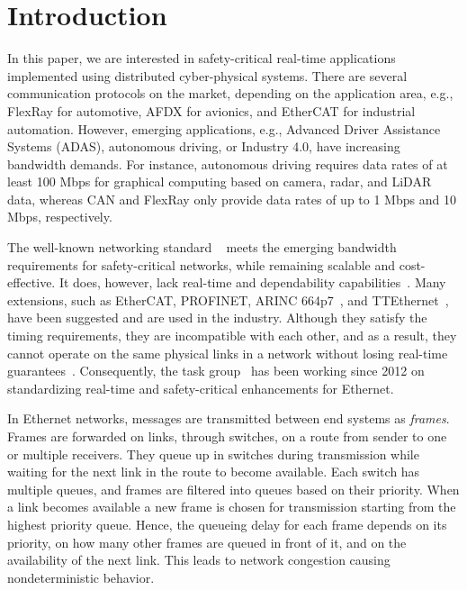 \vspace{-0.1cm}
\section{Introduction}
In this paper, we are interested in safety-critical real-time applications implemented using distributed cyber-physical systems. There are several communication protocols on the market, depending on the application area, e.g., FlexRay for automotive, AFDX for avionics, and EtherCAT for industrial automation.
However, emerging applications, e.g., Advanced Driver Assistance Systems (ADAS), autonomous driving, or Industry 4.0, have increasing bandwidth demands.
For instance, autonomous driving requires data rates of at least 100 Mbps for graphical computing based on camera, radar, and LiDAR data, whereas CAN and FlexRay only provide data rates of up to 1 Mbps and 10 Mbps, respectively.

The well-known networking standard ~\cite{8023} meets the emerging bandwidth requirements for safety-critical networks, while remaining scalable and cost-effective.
It does, however, lack real-time and dependability capabilities~\cite{decotignie5}.
Many extensions, such as EtherCAT, PROFINET, ARINC 664p7~\cite{ARINC2009}, and TTEthernet~\cite{ttethernet11}, have been suggested and are used in the industry.
Although they satisfy the timing requirements, they are incompatible with each other, and as a result, they cannot operate on the same physical links in a network without losing real-time guarantees~\cite{duerr16}.
Consequently, the  task group~\cite{8021tsn} has been working since 2012 on standardizing real-time and safety-critical enhancements for Ethernet.

In Ethernet networks, messages are transmitted between end systems as \emph{frames}.
Frames are forwarded on links, through switches, on a route from sender to one or multiple receivers.
They queue up in switches during transmission while waiting for the next link in the route to become available.
Each switch has multiple queues, and frames are filtered into queues based on their priority.
When a link becomes available a new frame is chosen for transmission starting from the highest priority queue.
Hence, the queueing delay for each frame depends on its priority, on how many other frames are queued in front of it, and on the availability of the next link.
This leads to network congestion causing nondeterministic behavior.

